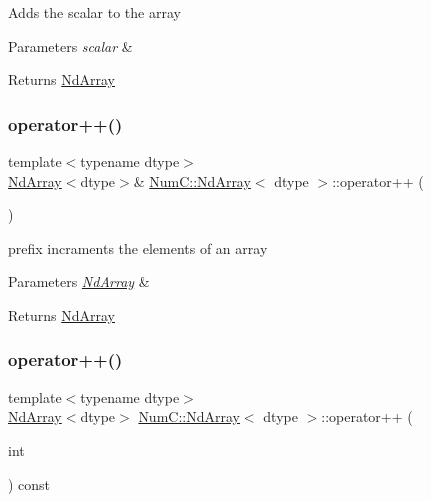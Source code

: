 Adds the scalar to the array


\begin{DoxyParams}{Parameters}
{\em scalar} & \\
\hline
\end{DoxyParams}
\begin{DoxyReturn}{Returns}
\mbox{\hyperlink{class_num_c_1_1_nd_array}{Nd\+Array}} 
\end{DoxyReturn}
\mbox{\label{class_num_c_1_1_nd_array_ac3973c61bcd5933d28b186c97a455e8d}} 
\subsubsection{\texorpdfstring{operator++()}{operator++()}\hspace{0.1cm}{\footnotesize\ttfamily [1/2]}}
{\footnotesize\ttfamily template$<$typename dtype$>$ \\
\mbox{\hyperlink{class_num_c_1_1_nd_array}{Nd\+Array}}$<$dtype$>$\& \mbox{\hyperlink{class_num_c_1_1_nd_array}{Num\+C\+::\+Nd\+Array}}$<$ dtype $>$\+::operator++ (\begin{DoxyParamCaption}{ }\end{DoxyParamCaption})\hspace{0.3cm}{\ttfamily [inline]}}

prefix incraments the elements of an array


\begin{DoxyParams}{Parameters}
{\em \mbox{\hyperlink{class_num_c_1_1_nd_array}{Nd\+Array}}} & \\
\hline
\end{DoxyParams}
\begin{DoxyReturn}{Returns}
\mbox{\hyperlink{class_num_c_1_1_nd_array}{Nd\+Array}} 
\end{DoxyReturn}
\mbox{\label{class_num_c_1_1_nd_array_a47f9898e6fbe353942d90ed1f37ff79a}} 
\subsubsection{\texorpdfstring{operator++()}{operator++()}\hspace{0.1cm}{\footnotesize\ttfamily [2/2]}}
{\footnotesize\ttfamily template$<$typename dtype$>$ \\
\mbox{\hyperlink{class_num_c_1_1_nd_array}{Nd\+Array}}$<$dtype$>$ \mbox{\hyperlink{class_num_c_1_1_nd_array}{Num\+C\+::\+Nd\+Array}}$<$ dtype $>$\+::operator++ (\begin{DoxyParamCaption}\item[{int}]{ }\end{DoxyParamCaption}) const\hspace{0.3cm}{\ttfamily [inline]}}

